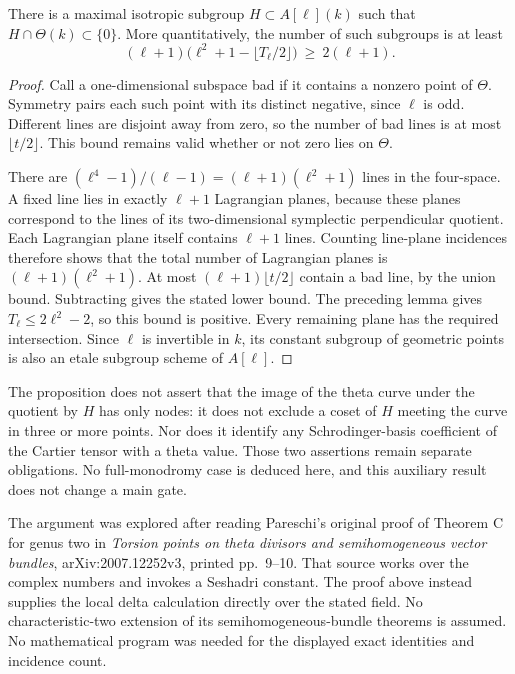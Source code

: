 \begin{proposition}
\label{prop:root-theta-avoiding-Lagrangian}
There is a maximal isotropic subgroup
\(H\subset A[\ell](k)\) such that
\(H\cap\Theta(k)\subset\{0\}\). More quantitatively,
the number of such subgroups is at least
\[
(\ell+1)\bigl(\ell^2+1-\lfloor T_\ell/2\rfloor\bigr)
 \ \ge\ 2(\ell+1).
\]
\end{proposition}
\begin{proof}
Call a one-dimensional subspace bad if it contains a
nonzero point of \(\Theta\). Symmetry pairs each such
point with its distinct negative, since \(\ell\) is odd.
Different lines are disjoint away from zero, so the
number of bad lines is at most \(\lfloor t/2\rfloor\).
This bound remains valid whether or not zero lies on
\(\Theta\).

There are \((\ell^4-1)/(\ell-1)=(\ell+1)(\ell^2+1)\)
lines in the four-space. A fixed line lies in exactly
\(\ell+1\) Lagrangian planes, because these planes
correspond to the lines of its two-dimensional
symplectic perpendicular quotient. Each Lagrangian
plane itself contains \(\ell+1\) lines. Counting
line-plane incidences therefore shows that the total
number of Lagrangian planes is
\((\ell+1)(\ell^2+1)\). At most
\((\ell+1)\lfloor t/2\rfloor\) contain a bad line,
by the union bound. Subtracting gives the stated
lower bound. The preceding lemma gives
\(T_\ell\le2\ell^2-2\), so this bound is positive.
Every remaining plane has the required intersection.
Since \(\ell\) is invertible in \(k\), its constant
subgroup of geometric points is also an etale subgroup
scheme of \(A[\ell]\).
\end{proof}

\begin{remark}
\label{rem:root-theta-avoidance-scope}
The proposition does not assert that the image of the
theta curve under the quotient by \(H\) has only nodes:
it does not exclude a coset of \(H\) meeting the curve
in three or more points. Nor does it identify any
Schrodinger-basis coefficient of the Cartier tensor
with a theta value. Those two assertions remain
separate obligations. No full-monodromy case is
deduced here, and this auxiliary result does not
change a main gate.

The argument was explored after reading Pareschi's
original proof of Theorem C for genus two in
\emph{Torsion points on theta divisors and
semihomogeneous vector bundles}, arXiv:2007.12252v3,
printed pp.~9--10. That source works over the complex
numbers and invokes a Seshadri constant. The proof
above instead supplies the local delta calculation
directly over the stated field. No characteristic-two
extension of its semihomogeneous-bundle theorems is
assumed. No mathematical program was needed for the
displayed exact identities and incidence count.
\end{remark}
